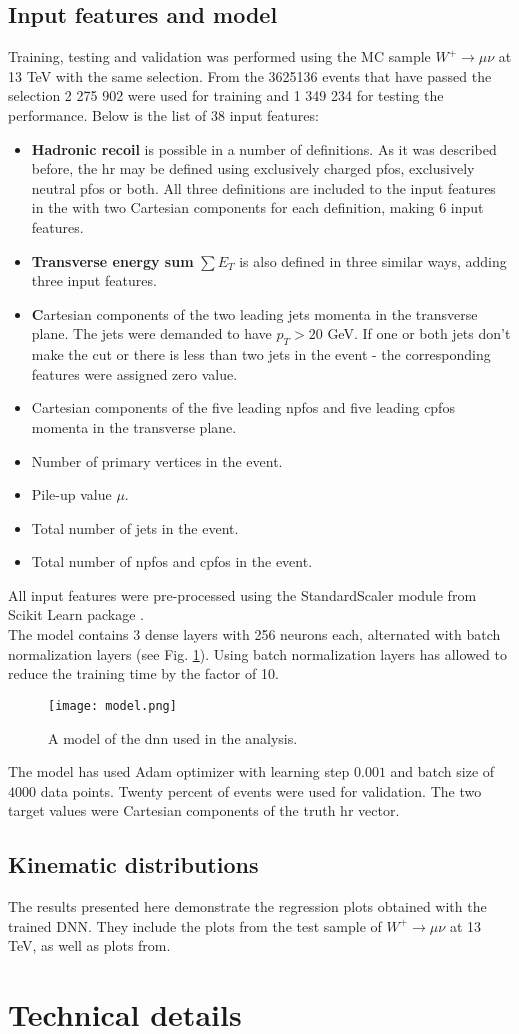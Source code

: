 \subsection{Input features and model}
 Training, testing and validation was performed using the MC sample $W^+\rightarrow\mu\nu$ at 13 TeV with the same selection. From the 3625136 events that have passed the selection 2 275 902 were used for training and 1 349 234 for testing the performance. 
 Below is the list of 38 input features: 
 \begin{itemize}
 \item \textbf{Hadronic recoil} is possible in a number of definitions. As it was described before, the \gls{hr} may be defined using exclusively charged \gls{pfos}, exclusively neutral \gls{pfos} or both. All three definitions are included to the input features in the with two Cartesian components for each definition, making 6 input features. 
 \item \textbf{Transverse energy sum} $\sum E_T$ is also defined in three similar ways, adding three input features.
 \item \textbf Cartesian components of the {two leading jets} momenta in the transverse plane. The jets were demanded to have $p_T>20$ GeV. If one or both jets don't make the cut or there is less than two jets in the event - the corresponding features were assigned zero value. 
 \item Cartesian components of the {five leading \gls{npfos} and five leading \gls{cpfos}} momenta in the transverse plane. 
 \item Number of primary vertices in the event.
 \item Pile-up value $\mu$.
 \item Total number of jets in the event.
 \item Total number of \gls{npfos} and \gls{cpfos} in the event.
\end{itemize}
All input features were pre-processed using the StandardScaler module from Scikit Learn package \cite{scikit-learn}.\\
The model contains 3 dense layers with 256 neurons each, alternated with batch normalization layers (see Fig. \ref{fig::nnmodel}). Using batch normalization layers has allowed to reduce the training time by the factor of 10. 
\begin{figure}[htpb]
	\centering
	\texttt{[image: model.png]}
	\caption{A model of the \gls{dnn} used in the analysis. }
	\label{fig::nnmodel}
\end{figure}
The model has used Adam optimizer with learning step $0.001$ and batch size of $4000$ data points. Twenty percent of events were used for validation. The two target values were Cartesian components of the truth \gls{hr} vector.

\subsection{Kinematic distributions} 
The results presented here demonstrate the regression plots obtained with the trained DNN. They include the plots from the test sample of $W^+\rightarrow\mu\nu$ at 13 TeV, as well as plots from.  


\section{Technical details}
